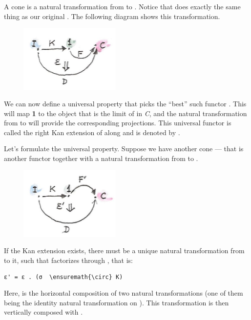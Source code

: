 \noindent
A cone is a natural transformation  from  to
. Notice that  does exactly the same thing as
our original . The following diagram shows this
transformation.

\begin{figure}[H]
\centering
\includegraphics[width=50mm]{images/kan3-e1492120491591.jpg}
\end{figure}

\noindent
We can now define a universal property that picks the ``best'' such
functor . This  will map \textbf{1} to the object
that is the limit of  in \emph{C}, and the natural
transformation  from  to  will
provide the corresponding projections. This universal functor is called
the right Kan extension of  along  and is denoted by
.

Let's formulate the universal property. Suppose we have another cone ---
that is another functor  together with a natural
transformation  from  to
.

\begin{figure}[H]
\centering
\includegraphics[width=50mm]{images/kan31-e1492120512209.jpg}
\end{figure}

\noindent
If the Kan extension  exists, there must be a unique
natural transformation  from  to it, such
that  factorizes through , that is:

\begin{Verbatim}[commandchars=\\\{\}]
ε' = ε . (σ  \ensuremath{\circ} K)
\end{Verbatim}
Here,  is the horizontal composition of two natural
transformations (one of them being the identity natural transformation
on ). This transformation is then vertically composed with
.

